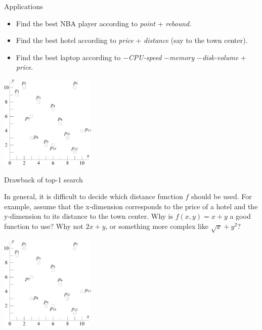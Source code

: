 \documentclass{beamer}
\begin{document}
    \begin{frame}{Applications}
    \begin{small}
		\begin{minipage}{0.48\linewidth}
		    \begin{itemize}
				\item Find the best NBA player according to {\em point} + {\em rebound}.
				\item Find the best hotel according to {\em price} + {\em distance} (say to the town center).
				\item Find the best laptop according to {\em $-$CPU-speed} {\em $-$memory} {\em $-$disk-volume} + {\em price}.
			\end{itemize}
		\end{minipage}
		\begin{minipage}{0.48\linewidth}
        \begin{center}
            \includegraphics[height=45mm]{./artwork/data.pdf}
        \end{center}
		\end{minipage}
    \end{small}
    \end{frame}
    \begin{frame}{Drawback of top-1 search}
    \begin{small}
        In general, it is difficult to decide which distance function $f$ should be used. For example, assume that the x-dimension corresponds to the price of a hotel and the y-dimension to its distance to the town center. Why is $f(x, y) = x + y$ a good function to use? Why not $2x + y$, or something more complex like $\sqrt{x} + y^2$?
        \begin{center}
            \includegraphics[height=45mm]{./artwork/data.pdf}
        \end{center}
    \end{small}
    \end{frame}
\end{document}
